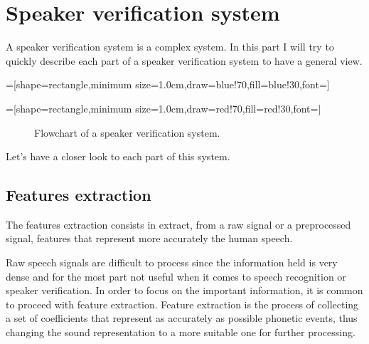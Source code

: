\documentclass{techrep}
\begin{document}
\section{Speaker verification system}

A speaker verification system is a complex system. In this part I will
try to quickly describe each part of a speaker verification system to
have a general view.

=[shape=rectangle,minimum
  size=1.0cm,draw=blue!70,fill=blue!30,font=\small]

=[shape=rectangle,minimum
  size=1.0cm,draw=red!70,fill=red!30,font=\small]

\begin{figure}[H]
  \begin{center}
  \end{center}
  \caption{Flowchart of a speaker verification system.}
  \label{flowchart_svs}
\end{figure}

Let's have a closer look to each part of this system.

\subsection{Features extraction}

The features extraction consists in extract, from a raw signal or a
preprocessed signal, features that represent more accurately the
human speech.

Raw speech signals are difficult to process since the information held
is very dense and for the most part not useful when it comes to speech
recognition or speaker verification. In order to focus on the
important information, it is common to proceed with feature
extraction.  Feature extraction is the process of collecting a set of
coefficients that represent as accurately as possible phonetic events,
thus changing the sound representation to a more suitable one for
further processing.
\end{document}
